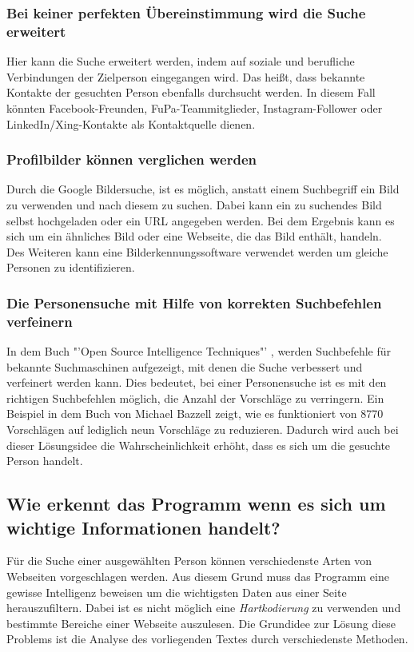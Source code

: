 		\subsubsection{Bei keiner perfekten Übereinstimmung wird die Suche erweitert}	
		Hier kann die Suche erweitert werden, indem auf soziale und berufliche Verbindungen der Zielperson eingegangen wird. Das heißt, dass bekannte Kontakte der gesuchten Person ebenfalls durchsucht werden. In diesem Fall könnten Facebook-Freunden, FuPa-Teammitglieder, Instagram-Follower oder LinkedIn/Xing-Kontakte als Kontaktquelle dienen.
		\subsubsection{Profilbilder können verglichen werden}
		Durch die Google Bildersuche, ist es möglich, anstatt einem Suchbegriff ein Bild zu verwenden und nach diesem zu suchen. Dabei kann ein zu suchendes Bild selbst hochgeladen oder ein URL angegeben werden. Bei dem Ergebnis kann es sich um ein ähnliches Bild oder eine Webseite, die das Bild enthält, handeln.\\
		Des Weiteren kann eine Bilderkennungssoftware verwendet werden um gleiche Personen zu identifizieren. %
		\subsubsection{Die Personensuche mit Hilfe von korrekten Suchbefehlen verfeinern}	In dem Buch "'Open Source Intelligence Techniques"' \cite{Bazzell}, werden Suchbefehle für bekannte Suchmaschinen aufgezeigt, mit denen die Suche verbessert und verfeinert werden kann. Dies bedeutet, bei einer Personensuche ist es mit den richtigen Suchbefehlen möglich, die Anzahl der Vorschläge zu verringern. Ein Beispiel in dem Buch von Michael Bazzell zeigt, wie es funktioniert von 8770 Vorschlägen auf lediglich neun Vorschläge zu reduzieren. \cite{Bazzell}Dadurch wird auch bei dieser Lösungsidee die Wahrscheinlichkeit erhöht, dass es sich um die gesuchte Person handelt.
		
	\subsection{Wie erkennt das Programm wenn es sich um wichtige Informationen handelt?}
	
	Für die Suche einer ausgewählten Person können verschiedenste Arten von Webseiten vorgeschlagen werden. Aus diesem Grund muss das Programm eine gewisse Intelligenz beweisen um die wichtigsten Daten aus einer Seite herauszufiltern. Dabei ist es nicht möglich eine \textit{Hartkodierung} zu verwenden und bestimmte Bereiche einer Webseite auszulesen. Die Grundidee zur Lösung diese Problems ist die Analyse des vorliegenden Textes durch verschiedenste Methoden.
